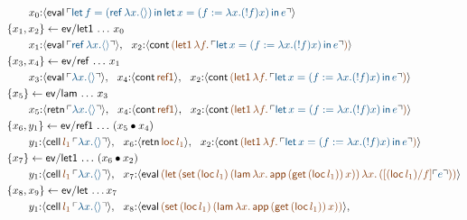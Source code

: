 \begin{sidewaysfigure}[p]\label{fig:bigbackpatch}\small
\begin{align*}
&\qquad 
x_0{:}\susp{{\sf eval}\,
  \interp{{\sf let}\,f = ({\sf ref}\,\lambda x. \langle\rangle) \,{\sf in}\,
          {\sf let}\,x = (f := \lambda x. ({!}f) x)\,{\sf in}\,e}}
\\
& \trstep{x_1,x_2}{{\sf ev/let1}\,\ldots\,x_0}
\\
&\qquad
x_1{:}\susp{{\sf eval}\,\interp{{\sf ref}\,\lambda x. \langle\rangle}}, ~~
x_2{:}\susp{{\sf cont}\,
  \lf{({\sf let1}\,\lambda f.\,
  \interp{{\sf let}\, x = (f := \lambda x. ({!}f) x)\,{\sf in}\,e})}}
\\
& \trstep{x_3, x_4}{{\sf ev/ref}\,\ldots\,x_1}
\\
&\qquad
x_3{:}\susp{{\sf eval}\,\interp{\lambda x. \langle\rangle}}, ~~
x_4{:}\susp{{\sf cont}\,\lf{\sf ref1}}, ~~
x_2{:}\susp{{\sf cont}\,
  \lf{({\sf let1}\,\lambda f.\,
  \interp{{\sf let}\, x = (f := \lambda x. ({!}f) x)\,{\sf in}\,e})}}
\\
& \trstep{x_5}{{\sf ev/lam}\,\ldots\,x_3}
\\
&\qquad 
x_5{:}\susp{{\sf retn}\,\interp{\lambda x. \langle\rangle}}, ~~
x_4{:}\susp{{\sf cont}\,\lf{\sf ref1}}, ~~
x_2{:}\susp{{\sf cont}\,
  \lf{({\sf let1}\,\lambda f.\,
  \interp{{\sf let}\, x = (f := \lambda x. ({!}f) x)\,{\sf in}\,e})}}
\\
& \trstep{x_6,y_1}{{\sf ev/ref1}\,\ldots\,(\tfuser{x_5}{x_4})}
\\
&\qquad
y_1{:}\susp{{\sf cell}\,\lf{l_1}\,\interp{\lambda x. \langle\rangle}}, ~~
x_6{:}\susp{{\sf retn}\,\lf{{\sf loc}\,l_1}}, ~~
x_2{:}\susp{{\sf cont}\,
  \lf{({\sf let1}\,\lambda f.\,
  \interp{{\sf let}\, x = (f := \lambda x. ({!}f) x)\,{\sf in}\,e})}}
\\
& \trstep{x_7}{{\sf ev/let1}\,\ldots\,(\tfuser{x_6}{x_2})}
\\
&\qquad
y_1{:}\susp{{\sf cell}\,\lf{l_1}\,\interp{\lambda x. \langle\rangle}}, ~~
x_7{:}\susp{{\sf eval}\,
  \lf{({\sf let}\,({\sf set}\,\lf{({\sf loc}\,l_1)}\,({\sf lam}\,\lambda x.\,{\sf app}\,({\sf get}\,({\sf loc}\,l_1))\,x))\,\lambda x.\,([({\sf loc}\,l_1)/f]\interp{e}))}}
\\
& \trstep{x_8,x_9}{{\sf ev/let}\,\ldots x_7}
\\
&\qquad
y_1{:}\susp{{\sf cell}\,\lf{l_1}\,\interp{\lambda x. \langle\rangle}}, ~~
x_8{:}\susp{{\sf eval}\,
  \lf{({\sf set}\,\lf{({\sf loc}\,l_1)}\,({\sf lam}\,\lambda x.\,{\sf app}\,({\sf get}\,({\sf loc}\,l_1))\,x))}}, ~~

\end{align*}
\end{sidewaysfigure}
